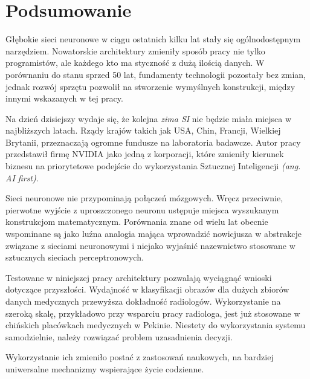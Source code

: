 \documentclass[12pt,a4paper,twoside,titlepage,openright]{book}
\begin{document}

\chapter*{Podsumowanie}
Głębokie sieci neuronowe w ciągu ostatnich kilku lat stały się ogólnodostępnym narzędziem. Nowatorskie architektury zmieniły sposób pracy nie tylko programistów, ale każdego kto ma styczność z dużą ilością danych. W porównaniu do stanu sprzed 50 lat, fundamenty technologii pozostały bez zmian, jednak rozwój sprzętu pozwolił na stworzenie wymyślnych konstrukcji, między innymi wskazanych w tej pracy.

Na dzień dzisiejszy wydaje się, że kolejna \textit{zima SI} nie będzie miała miejsca w najbliższych latach. Rządy krajów takich jak USA, Chin, Francji, Wielkiej Brytanii, przeznaczają ogromne fundusze na laboratoria badawcze. Autor pracy przedstawił firmę NVIDIA jako jedną z korporacji, które zmieniły kierunek biznesu na priorytetowe podejście do wykorzystania Sztucznej Inteligencji \textit{(ang. AI first)}.

Sieci neuronowe nie przypominają połączeń mózgowych. Wręcz przeciwnie, pierwotne wyjście z uproszczonego neuronu ustępuje miejsca wyszukanym konstrukcjom matematycznym. Porównania znane od wielu lat obecnie wspominane są jako luźna analogia mająca wprowadzić nowicjusza w abstrakcje związane z sieciami neuronowymi i niejako wyjaśnić nazewnictwo stosowane w sztucznych sieciach perceptronowych.

Testowane w niniejszej pracy architektury pozwalają wyciągnąć wnioski dotyczące przyszłości. Wydajność w klasyfikacji obrazów dla dużych zbiorów danych medycznych przewyższa dokładność radiologów. Wykorzystanie na szeroką skalę, przykładowo przy wsparciu pracy radiologa, jest już stosowane w chińskich placówkach medycznych w Pekinie. Niestety do wykorzystania systemu samodzielnie, należy rozwiązać problem uzasadnienia decyzji.

   Wykorzystanie ich zmieniło postać z zastosowań naukowych, na bardziej uniwersalne mechanizmy wspierające życie codzienne.


\listoffigures


\printbibliography
\end{document}
